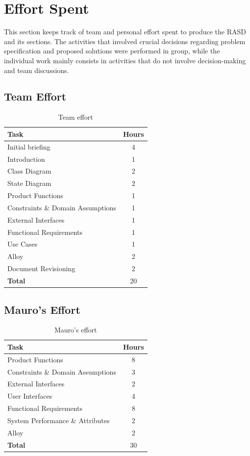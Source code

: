 \documentclass[10pt]{article}
\begin{document}
\section{Effort Spent}
This section keeps track of team and personal effort spent to produce the RASD and its sections. The activities that involved crucial decisions regarding problem specification and proposed solutions were
performed in group, while the individual work mainly consists in activities that do not involve decision-making and team discussions.
\subsection{Team Effort}
\begin{table}[h!]
    \begin{center}
    \begin{tabular}{|l|c|}
    \hline
    \textbf{Task} & \textbf{Hours} \\
    \hline
    Initial briefing & 4 \\
    Introduction & 1 \\
    Class Diagram & 2 \\
    State Diagram & 2 \\
    Product Functions & 1 \\
    Constraints \& Domain Assumptions & 1 \\
    External Interfaces & 1 \\
    Functional Requirements & 1 \\
    Use Cases & 1 \\
    Alloy & 2 \\
    Document Revisioning & 2 \\
    \hline
    \hline
    \textbf{Total} & 20 \\
    \hline
    \end{tabular}
    \end{center}
    \caption{Team effort}
\end{table}
\subsection{Mauro's Effort}
\begin{table}[h!]
    \begin{center}
    \begin{tabular}{|l|c|}
    \hline
    \textbf{Task} & \textbf{Hours} \\
    \hline
    Product Functions & 8 \\
    Constraints \& Domain Assumptions & 3 \\
    External Interfaces & 2 \\
    User Interfaces & 4 \\
    Functional Requirements & 8 \\
    System Performance \& Attributes  & 2 \\
    Alloy & 2 \\
    \hline
    \hline
    \textbf{Total} & 30 \\
    \hline
    \end{tabular}
    \end{center}
    \caption{Mauro's effort}
\end{table}
\end{document}
